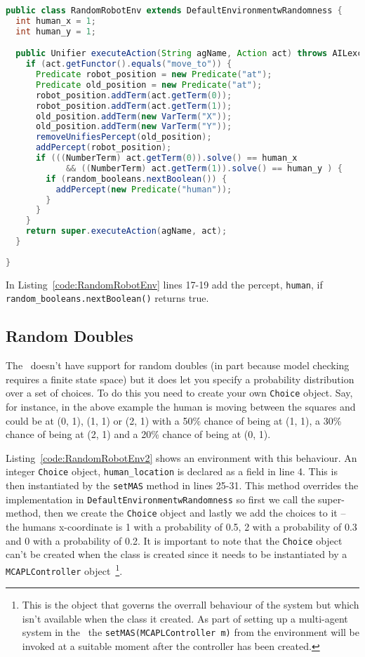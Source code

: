\documentclass[a4]{article}
\begin{document}
\begin{lstlisting}[float,caption=RandomRobotEnv,basicstyle=\sffamily,language=Java,style=easslisting,label=code:RandomRobotEnv]
public class RandomRobotEnv extends DefaultEnvironmentwRandomness {
  int human_x = 1;
  int human_y = 1;

  public Unifier executeAction(String agName, Action act) throws AILexception {
    if (act.getFunctor().equals("move_to")) {
      Predicate robot_position = new Predicate("at");
      Predicate old_position = new Predicate("at");
      robot_position.addTerm(act.getTerm(0));
      robot_position.addTerm(act.getTerm(1));
      old_position.addTerm(new VarTerm("X"));
      old_position.addTerm(new VarTerm("Y"));
      removeUnifiesPercept(old_position);
      addPercept(robot_position);
      if (((NumberTerm) act.getTerm(0)).solve() == human_x 
            && ((NumberTerm) act.getTerm(1)).solve() == human_y ) {
        if (random_booleans.nextBoolean()) {
          addPercept(new Predicate("human"));
        }
      }
    }
    return super.executeAction(agName, act);
  }
	      
}
\end{lstlisting}

\begin{sloppypar}
In Listing~\ref{code:RandomRobotEnv} lines 17-19 add the percept, \lstinline{human}, if \texttt{random\_booleans.nextBoolean()} returns true.
\end{sloppypar}

\subsection{Random Doubles}
The \ail\ doesn't have support for random doubles (in part because model checking requires a finite state space) but it does let you specify a probability distribution over a set of choices.  To do this you need to create your own \texttt{Choice} object.  Say, for instance, in the above example the human is moving between the squares and could be at (0, 1), (1, 1) or (2, 1) with a 50\% chance of being at (1, 1), a 30\% chance of being at (2, 1) and a 20\% chance of being at (0, 1).

Listing~\ref{code:RandomRobotEnv2} shows an environment with this behaviour.  An integer \texttt{Choice} object, \texttt{human\_location} is declared as a field in line 4.  This is then instantiated by the \texttt{setMAS} method in lines 25-31.  This method overrides the implementation in \texttt{DefaultEnvironmentwRandomness} so first we call the super-method, then we create the \texttt{Choice} object and lastly we add the choices to it -- the humans x-coordinate is 1 with a probability of 0.5, 2 with a probability of 0.3 and 0 with a probability of 0.2.  It is important to note that the \texttt{Choice} object can't be created when the class is created since it needs to be instantiated by a \texttt{MCAPLController} object~\footnote{This is the object that governs the overrall behaviour of the system but which isn't available when the class it created.  As part of setting up a multi-agent system in the \ail\ the \texttt{setMAS(MCAPLController m)} from the environment will be invoked at a suitable moment after the controller has been created.}.
\end{document}
